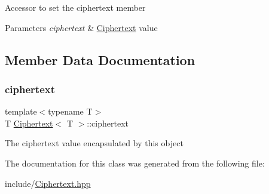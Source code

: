 Accessor to set the ciphertext member 
\begin{DoxyParams}{Parameters}
{\em ciphertext} & \hyperlink{classCiphertext}{Ciphertext} value \\
\hline
\end{DoxyParams}


\subsection{Member Data Documentation}
\mbox{\label{classCiphertext_adef9aae9d923eb100b4a1ad58ce495f1}} 
\subsubsection{\texorpdfstring{ciphertext}{ciphertext}}
{\footnotesize\ttfamily template$<$typename T$>$ \\
T \hyperlink{classCiphertext}{Ciphertext}$<$ T $>$\+::ciphertext\hspace{0.3cm}{\ttfamily [protected]}}

The ciphertext value encapsulated by this object 

The documentation for this class was generated from the following file\+:\begin{DoxyCompactItemize}
\item 
include/\hyperlink{Ciphertext_8hpp}{Ciphertext.\+hpp}\end{DoxyCompactItemize}
